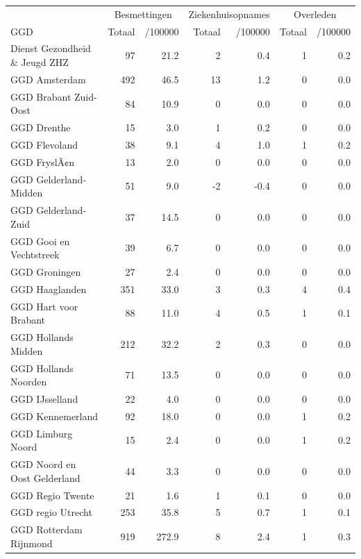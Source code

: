 \documentclass[
  english,
  man,floatsintext]{apa6}
\begin{document}
\begin{table}[H]
\centering\begingroup\fontsize{10}{12}\selectfont

\begin{threeparttable}
\begin{tabular}{lrrrrrr}
\toprule
\multicolumn{1}{c}{ } & \multicolumn{2}{c}{Besmettingen} & \multicolumn{2}{c}{Ziekenhuisopnames} & \multicolumn{2}{c}{Overleden} \\
\cmidrule(l{3pt}r{3pt}){2-3} \cmidrule(l{3pt}r{3pt}){4-5} \cmidrule(l{3pt}r{3pt}){6-7}
GGD & Totaal & /100000 & Totaal & /100000 & Totaal & /100000\\
\midrule
Dienst Gezondheid \& Jeugd ZHZ & 97 & 21.2 & 2 & 0.4 & 1 & 0.2\\
GGD Amsterdam & 492 & 46.5 & 13 & 1.2 & 0 & 0.0\\
GGD Brabant Zuid-Oost & 84 & 10.9 & 0 & 0.0 & 0 & 0.0\\
GGD Drenthe & 15 & 3.0 & 1 & 0.2 & 0 & 0.0\\
GGD Flevoland & 38 & 9.1 & 4 & 1.0 & 1 & 0.2\\
GGD FryslÃ¢n & 13 & 2.0 & 0 & 0.0 & 0 & 0.0\\
GGD Gelderland-Midden & 51 & 9.0 & -2 & -0.4 & 0 & 0.0\\
GGD Gelderland-Zuid & 37 & 14.5 & 0 & 0.0 & 0 & 0.0\\
GGD Gooi en Vechtstreek & 39 & 6.7 & 0 & 0.0 & 0 & 0.0\\
GGD Groningen & 27 & 2.4 & 0 & 0.0 & 0 & 0.0\\
GGD Haaglanden & 351 & 33.0 & 3 & 0.3 & 4 & 0.4\\
GGD Hart voor Brabant & 88 & 11.0 & 4 & 0.5 & 1 & 0.1\\
GGD Hollands Midden & 212 & 32.2 & 2 & 0.3 & 0 & 0.0\\
GGD Hollands Noorden & 71 & 13.5 & 0 & 0.0 & 0 & 0.0\\
GGD IJsselland & 22 & 4.0 & 0 & 0.0 & 0 & 0.0\\
GGD Kennemerland & 92 & 18.0 & 0 & 0.0 & 1 & 0.2\\
GGD Limburg Noord & 15 & 2.4 & 0 & 0.0 & 1 & 0.2\\
GGD Noord en Oost Gelderland & 44 & 3.3 & 0 & 0.0 & 0 & 0.0\\
GGD Regio Twente & 21 & 1.6 & 1 & 0.1 & 0 & 0.0\\
GGD regio Utrecht & 253 & 35.8 & 5 & 0.7 & 1 & 0.1\\
GGD Rotterdam Rijnmond & 919 & 272.9 & 8 & 2.4 & 1 & 0.3\\

\end{tabular}
\end{threeparttable}
\end{table}
\end{document}
